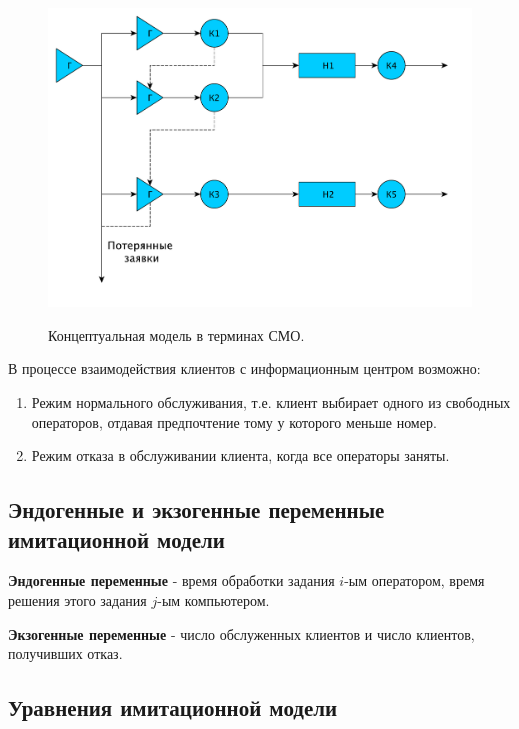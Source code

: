 \documentclass[a4paper,12pt]{article}
\begin{document}
	\begin{figure}[h!]
		\begin{center}
			{\includegraphics[scale = 0.6]{model2.pdf}}
			\label{ris:model2}
		\end{center}
		\caption{Концептуальная модель в терминах СМО.}
	\end{figure}
	
	В процессе взаимодействия клиентов с информационным центром возможно:
	\begin{enumerate}
		\item Режим нормального обслуживания, т.е. клиент выбирает одного из свободных операторов, отдавая предпочтение тому у которого меньше номер.
		\item Режим отказа в обслуживании клиента, когда все операторы заняты.
	\end{enumerate}

	\newpage

	\subsection*{Эндогенные и экзогенные переменные имитационной модели}

	{\bf Эндогенные переменные} - время обработки задания $i$-ым оператором,
	время решения этого задания $j$-ым компьютером.
	
	{\bf Экзогенные переменные} - число обслуженных клиентов и число клиентов, получивших отказ.

	\subsection*{Уравнения имитационной модели}
	
\end{document}
